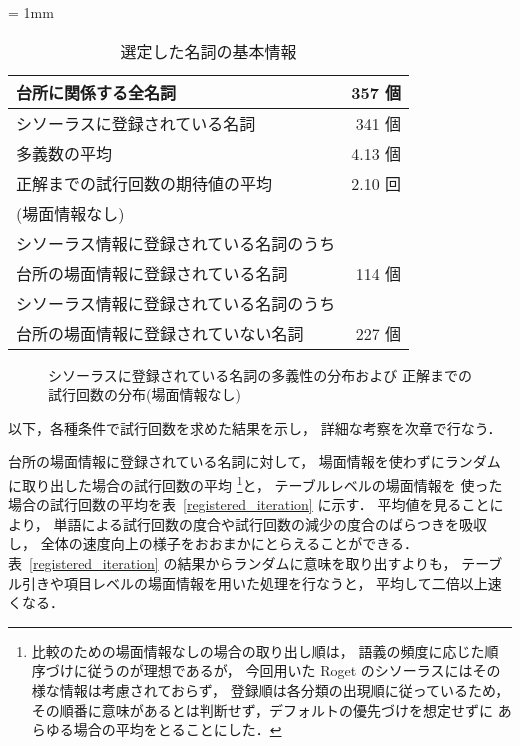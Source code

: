 \small
\begin{table}
  \caption{選定した名詞の基本情報}
  \label{result}
  \begin{center}
    \tabcolsep = 1mm
    \begin{tabular}{|l|r|} \hline
台所に関係する全名詞 & 357 個 \\ \hline
シソーラスに登録されている名詞 & 341 個 \\
多義数の平均 & 4.13 個 \\
正解までの試行回数の期待値の平均 & 2.10 回\\
(場面情報なし)                   &        \\ \hline
シソーラス情報に登録されている名詞のうち & \\
台所の場面情報に登録されている名詞 & 114 個 \\
シソーラス情報に登録されている名詞のうち & \\
台所の場面情報に登録されていない名詞 & 227 個 \\ \hline
    \end{tabular}
  \end{center}
\end{table}
\normalsize

\begin{figure}
  \begin{center}
  \end{center}
  \caption{シソーラスに登録されている名詞の多義性の分布および
  正解までの試行回数の分布(場面情報なし)}
  \label{ambiguity}
  \vspace*{3mm}
\end{figure}

以下，各種条件で試行回数を求めた結果を示し，
詳細な考察を次章で行なう．

台所の場面情報に登録されている名詞に対して，
場面情報を使わずにランダムに取り出した場合の試行回数の平均
\footnote{
比較のための場面情報なしの場合の取り出し順は，
語義の頻度に応じた順序づけに従うのが理想であるが，
今回用いた Roget のシソーラスにはその様な情報は考慮されておらず，
登録順は各分類の出現順に従っているため，
その順番に意味があるとは判断せず，デフォルトの優先づけを想定せずに
あらゆる場合の平均をとることにした．
}と，
テーブルレベルの場面情報を
使った場合の試行回数の平均を表~\ref{registered_iteration} に示す．
平均値を見ることにより，
単語による試行回数の度合や試行回数の減少の度合のばらつきを吸収し，
全体の速度向上の様子をおおまかにとらえることができる．
表~\ref{registered_iteration} の結果からランダムに意味を取り出すよりも，
テーブル引きや項目レベルの場面情報を用いた処理を行なうと，
平均して二倍以上速くなる．

